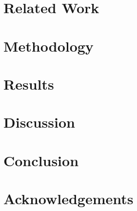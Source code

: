\documentclass{article}
\begin{document}
\section{Related Work}


\section{Methodology}


\section{Results}


\section{Discussion}


\section{Conclusion}


\section{Acknowledgements}


  


%
%
%

\end{document}
